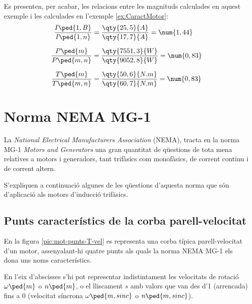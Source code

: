 \begin{exemple}
	Es presenten, per acabar, les relacions entre les magnituds calculades en aquest exemple i les calculades en l'exemple \ref{ex:CaractMotor}:
	\begin{align*}
		\frac{I\ped{1,B}}{I\ped{1,n}} &=  \frac{\qty{25,5}{A}}{\qty{17,7}{A}}= \num{1,44} \\[1.5ex]
		\frac{P\ped{m}}{P\ped{m,n}} &= \frac{\qty{7551,3}{W}}{\qty{9052,8}{W}} = \num{0,83} \\[1.5ex]
		\frac{T\ped{m}}{T\ped{m,n}} &=  \frac{\qty{50,6}{N.m}}{\qty{60,7}{N.m}} = \num{0,83}
	\end{align*}
	
\end{exemple}	    
	    
\section{Norma NEMA MG-1}

La \textit{National Electrical Manufacturers Association} (NEMA),
tracta en la norma  MG-1 \textit{Motors and Generators} una gran quantitat de qüestions de tota mena relatives a motors i generadors, tant trifàsics com monofàsics, de corrent continu i de corrent altern.

S'expliquen a continuació algunes de les qüestions d'aquesta norma que són d'aplicació als motors d'inducció trifàsics.

\subsection{Punts característics de la corba parell-velocitat}

En la figura \vref{pic:mot-punts-T-vel} es representa una corba típica parell-velocitat d'un motor, assenyalant-hi quatre punts als quals la norma NEMA MG-1 els dona uns noms característics. 

En l'eix d'abscisses s'hi pot representar indistintament les velocitats de rotació $\omega\ped{m}$ o $n\ped{m}$, o  el lliscament $s$ amb valors que van des d'1 (arrencada) fins a 0 (velocitat síncrona $\omega\ped{m,sinc}$ o $n\ped{m,sinc}$).

\begin{center}
	
	\label{pic:mot-punts-T-vel}
\end{center}

